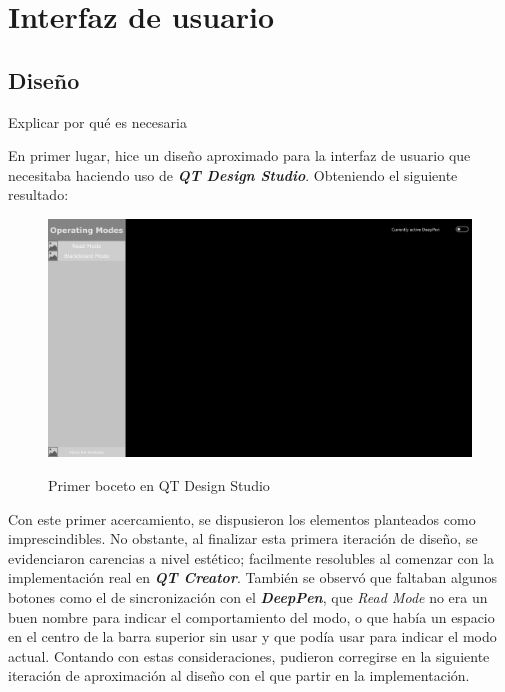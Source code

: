 \chapter{Interfaz de usuario}
\section{Diseño}
{\color{red} Explicar por qué es necesaria}

En primer lugar, hice un diseño aproximado para la interfaz de usuario que
necesitaba haciendo uso de \textbf{\textit{QT Design Studio}}. Obteniendo el
siguiente resultado:

\begin{figure}[h]
    \centering
    \includegraphics[width=1\textwidth]{capturas/DisenoUsuario1.png}\\[-0,40cm]
    \caption{Primer boceto en QT Design Studio}
    \end{figure}

Con este primer acercamiento, se dispusieron los elementos planteados como imprescindibles.
No obstante, al finalizar esta primera iteración de diseño, se evidenciaron
carencias a nivel estético; facilmente resolubles al comenzar con la
implementación real en \textbf{\textit{QT Creator}}. También se observó que faltaban
algunos botones como el de sincronización con el \textbf{\textit{DeepPen}},
que \textit{Read Mode} no era un buen nombre para indicar el comportamiento
del modo, o que había un espacio en el centro de la barra superior sin usar y
que podía usar para indicar el modo actual.\newline
Contando con estas consideraciones, pudieron corregirse en la siguiente iteración
de aproximación al diseño con el que partir en la implementación.

